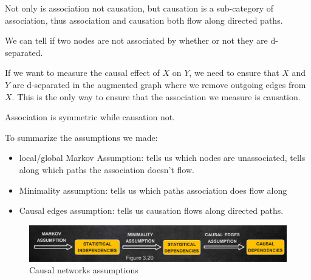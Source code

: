 Not only is association not causation, but causation is a sub-category of association,
thus association and causation both flow along directed paths.

We can tell if two nodes are not associated by whether or not they are d-separated.

If we want to measure the causal effect of $X$ on $Y$, we need to ensure that $X$
and $Y$ are d-separated in the augmented graph where we remove outgoing edges
from $X$. This is the only way to ensure that the association we measure is causation.

\begin{note}
    Association is symmetric while causation not.
\end{note}

To summarize the assumptions we made:
\begin{itemize}
    \item local/global Markov Assumption: tells us which nodes are unassociated,
          tells along which paths the association doesn't flow.
    \item Minimality assumption: tells us which paths association does flow along
    \item Causal edges assumption: tells us causation flows along directed paths.
\end{itemize}
\begin{figure}[!h]
    \centering
    \includegraphics*[width=\textwidth]{img/flow/causal_networks_assumptions.png}
    \caption{Causal networks assumptions}
    \label{fig:causal_networks_assumptions}
\end{figure}

